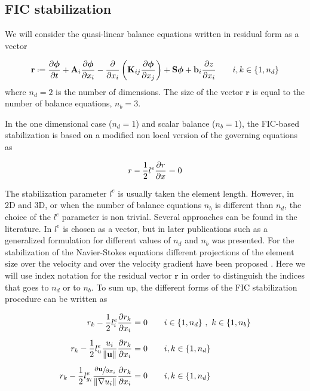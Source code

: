 \subsection{FIC stabilization}
\label{sec:stabilization}

We will consider the quasi-linear balance equations written in residual form as a vector

\begin{equation} \label{residual}
\mathbf{r} \defeq 
  \pder{\bm{\phi}}{t} + \mathbf{A}_i\pder{\bm{\phi}}{x_i}
  -\pder{}{x_i}\left(\mathbf{K}_{ij}\pder{\bm{\phi}}{x_j}\right) + \mathbf{S}\bm{\phi} + \mathbf{b}_i\pder{z}{x_i} \qquad i,k\in\{1,n_d\}
\end{equation}
where $n_d=2$ is the number of dimensions. The size of the vector $\mathbf{r}$ is equal to the number of balance equations, $n_b=3$.

In the one dimensional case ($n_d=1$) and scalar balance ($n_b=1$), the FIC-based stabilization is based on a modified non local version of the governing equations as \cite{onate1998}

\begin{equation}
r - \frac{1}{2}l^e\frac{\partial r}{\partial x} = 0
\end{equation}

The stabilization parameter $l^e$ is usually taken the element length. However, in 2D and 3D, or when the number of balance equations $n_b$ is different than $n_d$, the choice of the $l^e$ parameter is non trivial.
Several approaches can be found in the literature. In \cite{onate1998} $l^e$ is chosen as a vector, but in later publications such as \cite{onate2001} a generalized formulation for different values of $n_d$ and $n_b$ was presented.
For the stabilization of the Navier-Stokes equations different projections of the element size over the velocity and over the velocity gradient have been proposed \cite{cotela2016}. Here we will use index notation for the residual vector $\mathbf{r}$ in order to distinguish the indices that goes to $n_d$ or to $n_b$. To sum up, the different forms of the FIC stabilization procedure can be written as

\begin{subequations}
\begin{align}
r_{k} - \frac{1}{2}l^e_i\frac{\partial r_k}{\partial x_i} &= 0
    \qquad i\in\{1,n_d\} \ ,\ k\in\{1,n_b\}\\[5pt]
r_{k} - \frac{1}{2}l^e_u\frac{u_i}{\lVert\mathbf{u}\rVert}\frac{\partial r_k}{\partial x_i} &= 0
    \qquad i,k\in\{1,n_d\}\\[5pt]
r_{k} - \frac{1}{2}l^e_{g_i}\frac{\sfrac{\partial\mathbf{u}}{\partial x_i}}{\lVert\nabla u_i\rVert}\frac{\partial r_k}{\partial x_i} &= 0
    \qquad i,k\in\{1,n_d\}
\end{align}
\end{subequations}

